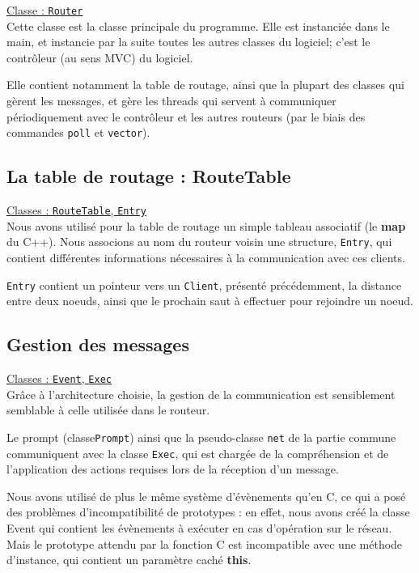 \documentclass[a4paper,11pt]{article}
\begin{document}
\underline{Classe : \texttt{Router}}\\

Cette classe est la classe principale du programme. Elle est instanciée dans le main, et instancie par la suite toutes les autres
classes du logiciel; c'est le contrôleur (au sens MVC) du logiciel.

Elle contient notamment la table de routage, ainsi que la plupart des classes qui gèrent les messages, et gère les threads
qui servent à communiquer périodiquement avec le contrôleur et les autres routeurs (par le biais des commandes \texttt{poll} et \texttt{vector}).

\subsection{La table de routage : RouteTable}

\underline{Classes : \texttt{RouteTable}, \texttt{Entry}}\\

Nous avons utilisé pour la table de routage un simple tableau associatif (le \textbf{map} du C++).
Nous associons au nom du routeur voisin une structure, \texttt{Entry}, qui contient différentes informations nécessaires
à la communication avec ces clients.

\texttt{Entry} contient un pointeur vers un \texttt{Client}, présenté précédemment, la distance entre deux noeuds, ainsi que
le prochain saut à effectuer pour rejoindre un noeud.

\subsection{Gestion des messages}

\underline{Classes : \texttt{Event}, \texttt{Exec}}\\

Grâce à l'architecture choisie, la gestion de la communication est sensiblement semblable à celle utilisée dans le
routeur.

Le prompt (classe\texttt{Prompt}) ainsi que la pseudo-classe \texttt{net} de la partie commune communiquent avec la classe \texttt{Exec},
 qui est chargée de la compréhension et de l'application des actions requises lors de la réception d'un message.

Nous avons utilisé de plus le même système d'évènements qu'en C, ce qui a posé des problèmes d'incompatibilité de prototypes : en effet,
nous avons créé la classe Event qui contient les évènements à exécuter en cas d'opération sur le réseau. Mais le prototype attendu par la fonction C
est incompatible avec une méthode d'instance, qui contient un paramètre caché \textbf{this}.
\end{document}
